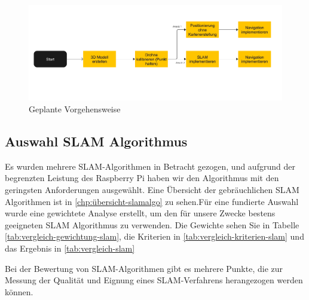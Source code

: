 \begin{figure}
    \includegraphics[scale=0.7]{images/ansatz_plan.pdf}
    \caption{Geplante Vorgehensweise}\label{fig:vorgehensweise}
\end{figure}

\subsection{Auswahl SLAM Algorithmus}

Es wurden mehrere \ac{SLAM}-Algorithmen in Betracht gezogen, und aufgrund der begrenzten Leistung des Raspberry Pi haben wir den Algorithmus mit den geringsten Anforderungen ausgewählt. Eine Übersicht der gebräuchlichen \ac{SLAM} Algorithmen ist in \ref{chp:übersicht-slamalgo} zu sehen.Für eine fundierte Auswahl wurde eine gewichtete Analyse erstellt, um den für unsere Zwecke bestens geeigneten \ac{SLAM} Algorithmus zu verwenden. Die Gewichte sehen Sie in Tabelle \ref{tab:vergleich-gewichtung-slam}, die Kriterien in \ref{tab:vergleich-kriterien-slam} und das Ergebnis in \ref{tab:vergleich-slam}

Bei der Bewertung von SLAM-Algorithmen gibt es mehrere Punkte, die zur Messung der Qualität und Eignung eines SLAM-Verfahrens herangezogen werden können.

